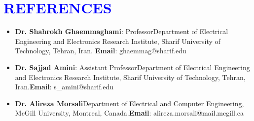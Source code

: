 \documentclass[letterpaper,11pt]{article}
\newcommand{\resumeSubHeadingListStart}{\begin{itemize}[leftmargin=0.0in, label={}]}
\begin{document}
\section{\textcolor{blue}{REFERENCES}}
        \begin{itemize}[itemsep=-2pt, parsep=5pt]
            \item \textbf{Dr. Shahrokh Ghaemmaghami}: Professor\newline Department of Electrical Engineering and Electronics Research Institute, Sharif University of Technology, Tehran, Iran. \newline \textbf{Email}: ghaemmag@sharif.edu 
            
            \item \textbf{Dr. Sajjad Amini}: Assistant Professor\newline Department of Electrical Engineering and Electronics Research Institute, Sharif University of Technology, Tehran, Iran.\newline \textbf{Email}: s\_amini@sharif.edu
            
            
            \item \textbf{Dr. Alireza Morsali}\newline Department of Electrical and Computer Engineering, McGill University, Montreal, Canada.\newline \textbf{Email}:  alireza.morsali@mail.mcgill.ca
        \end{itemize}
 
 
 
 
 
\end{document}
